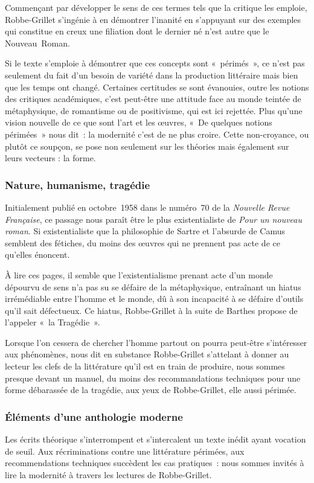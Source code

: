 \documentclass[12pt, a4paper]{article}
\begin{document}
Commençant par développer le sens de ces termes tels que la critique les emploie, Robbe-Grillet s'ingénie à en démontrer l'inanité en s'appuyant sur des exemples qui constitue en creux une filiation dont le dernier né n'est autre que le Nouveau~Roman.

Si le texte s'emploie à démontrer que ces concepts sont «~périmés~», ce n'est pas seulement du fait d'un besoin de variété dans la production littéraire mais bien que les temps ont changé. Certaines certitudes se sont évanouies, outre les notions des critiques académiques, c'est peut-être une attitude face au monde teintée de métaphysique, de romantisme ou de positivisme, qui est ici rejettée. Plus qu'une vision nouvelle de ce que sont l'art et les œuvres, «~De quelques notions périmées~» nous dit~: la modernité c'est de ne plus croire. Cette non-croyance, ou plutôt ce soupçon, se pose non seulement sur les théories mais également sur leurs vecteurs : la forme.


\subsubsection{Nature, humanisme, tragédie}
Initialement publié en octobre~1958 dans le numéro~70 de la \textit{Nouvelle Revue Française}, ce passage nous paraît être le plus existentialiste de \textit{Pour un nouveau roman}. Si existentialiste que la philosophie de Sartre et l'absurde de Camus semblent des fétiches, du moins des œuvres qui ne prennent pas acte de ce qu'elles énoncent.

À lire ces pages, il semble que l'existentialisme prenant acte d'un monde dépourvu de sens n'a pas su se défaire de la métaphysique, entraînant un hiatus irrémédiable entre l'homme et le monde, dû à son incapacité à se défaire d'outils qu'il sait défectueux. Ce hiatus, Robbe-Grillet à la suite de Barthes propose de l'appeler «~la Tragédie~».

Lorsque l'on cessera de chercher l'homme partout on pourra peut-être s'intéresser aux phénomènes, nous dit en substance Robbe-Grillet s'attelant à donner au lecteur les clefs de la littérature qu'il est en train de produire, nous sommes presque devant un manuel, du moins des recommandations techniques pour une forme débarassée de la tragédie, aux yeux de Robbe-Grillet, elle aussi périmée.

\subsubsection{Éléments d'une anthologie moderne}
Les écrits théorique s'interrompent et s'intercalent un texte inédit ayant vocation de seuil. Aux récriminations contre une littérature périmées, aux recommendations techniques succèdent les cas pratiques~: nous sommes invités à lire la modernité à travers les lectures de Robbe-Grillet.
\end{document}
